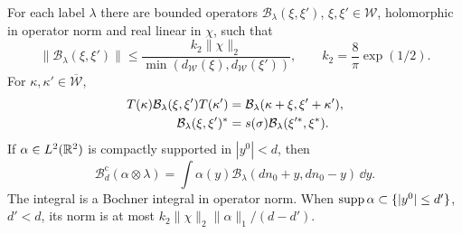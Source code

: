 \begin{proposition}\label{prop:rotation-point-plates}
For each label $\lambda$ there are bounded operators
$\mathcal B_\lambda(\xi,\xi')$, $\xi,\xi'\in\mathcal W$,
holomorphic in operator norm and real linear in $\chi$, such that
\begin{equation}\label{eq:rotation-point-bound}
 \|\mathcal B_\lambda(\xi,\xi')\|
 \le\frac{k_2\|\chi\|_2}
          {\min(d_{\mathcal W}(\xi),d_{\mathcal W}(\xi'))},
 \qquad k_2=\frac8\pi\exp(1/2).
\end{equation}
For $\kappa,\kappa'\in\overline{\mathcal W}$,
\begin{align}
 T(\kappa)\mathcal B_\lambda(\xi,\xi')T(\kappa')
   &=\mathcal B_\lambda(\kappa+\xi,\xi'+\kappa'),
                                   \label{eq:rotation-point-shift}\\
 \mathcal B_\lambda(\xi,\xi')^*
   &=s(\sigma)\mathcal B_\lambda(\xi'^*,\xi^*).\notag
\end{align}
If $\alpha\in L^2(\mathbb R^2)$ is compactly supported in $|y^0|<d$, then
\begin{equation}\label{eq:rotation-point-integral}
 \mathcal B_d^{\mathrm c}(\alpha\otimes\lambda)
   =\int\alpha(y)\mathcal B_\lambda(dn_0+y,dn_0-y)\,\dd y.
\end{equation}
The integral is a Bochner integral in operator norm.
When $\operatorname{supp}\alpha\subset\{|y^0|\le d'\}$, $d'<d$, its norm is at
most $k_2\|\chi\|_2\|\alpha\|_1/(d-d')$.
\end{proposition}

